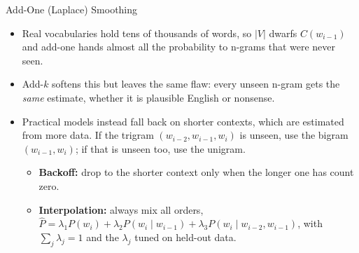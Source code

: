 \begin{frame}[allowframebreaks]{Add-One (Laplace) Smoothing}
    \begin{itemize}
        \item Real vocabularies hold tens of thousands of words, so $|V|$ dwarfs
        $C(w_{i-1})$ and add-one hands almost all the probability to n-grams that
        were never seen.
        \item Add-$k$ softens this but leaves the same flaw: every unseen n-gram gets
        the \emph{same} estimate, whether it is plausible English or nonsense.
        \item Practical models instead fall back on shorter contexts, which are
        estimated from more data. If the trigram $(w_{i-2}, w_{i-1}, w_i)$ is unseen,
        use the bigram $(w_{i-1}, w_i)$; if that is unseen too, use the unigram.
        \begin{itemize}
            \item \textbf{Backoff:} drop to the shorter context only when the longer
            one has count zero.
            \item \textbf{Interpolation:} always mix all orders,
            $\hat{P} = \lambda_1 P(w_i) + \lambda_2 P(w_i \mid w_{i-1})
            + \lambda_3 P(w_i \mid w_{i-2}, w_{i-1})$, with
            $\sum_j \lambda_j = 1$ and the $\lambda_j$ tuned on held-out data.
        \end{itemize}
    \end{itemize}
\end{frame}
